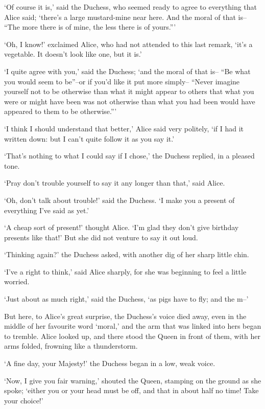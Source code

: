 \documentclass[12pt]{book}
\begin{document}
  `Of course it is,' said the Duchess, who seemed ready to agree
to everything that Alice said; `there's a large mustard-mine near
here.  And the moral of that is-- ``The more there is of mine, the
less there is of yours.'''

  `Oh, I know!' exclaimed Alice, who had not attended to this
last remark, `it's a vegetable.  It doesn't look like one, but it
is.'

  `I quite agree with you,' said the Duchess; `and the moral of
that is-- ``Be what you would seem to be''--or if you'd like it put
more simply-- ``Never imagine yourself not to be otherwise than
what it might appear to others that what you were or might have
been was not otherwise than what you had been would have appeared
to them to be otherwise.'''

  `I think I should understand that better,' Alice said very
politely, `if I had it written down:  but I can't quite follow it
as you say it.'

  `That's nothing to what I could say if I chose,' the Duchess
replied, in a pleased tone.

  `Pray don't trouble yourself to say it any longer than that,'
said Alice.

  `Oh, don't talk about trouble!' said the Duchess.  `I make you
a present of everything I've said as yet.'

  `A cheap sort of present!' thought Alice.  `I'm glad they don't
give birthday presents like that!'  But she did not venture to
say it out loud.

  `Thinking again?' the Duchess asked, with another dig of her
sharp little chin.

  `I've a right to think,' said Alice sharply, for she was
beginning to feel a little worried.

  `Just about as much right,' said the Duchess, `as pigs have to fly;
and the m--'

  But here, to Alice's great surprise, the Duchess's voice died
away, even in the middle of her favourite word `moral,' and the
arm that was linked into hers began to tremble.  Alice looked up,
and there stood the Queen in front of them, with her arms folded,
frowning like a thunderstorm.

  `A fine day, your Majesty!' the Duchess began in a low, weak
voice.

  `Now, I give you fair warning,' shouted the Queen, stamping on
the ground as she spoke; `either you or your head must be off,
and that in about half no time!  Take your choice!'
\end{document}
